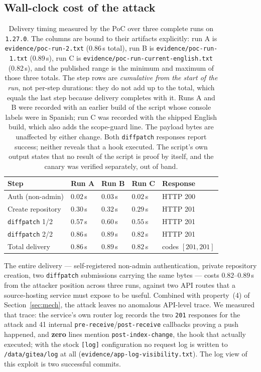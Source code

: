 \subsection{Wall-clock cost of the attack}
\label{sec:timing}

\begin{table}[t]
\centering
\footnotesize
\begin{tabular}{@{}p{2.0cm}p{1.0cm}p{1.0cm}p{1.0cm}p{1.7cm}@{}}
\toprule
Step & Run A & Run B & Run C & Response \\
\midrule
Auth (non-admin) & $0.02$\,s & $0.03$\,s & $0.02$\,s & HTTP 200 \\
Create repository & $0.30$\,s & $0.32$\,s & $0.29$\,s & HTTP 201 \\
\texttt{diffpatch} 1/2 & $0.57$\,s & $0.60$\,s & $0.55$\,s & HTTP 201 \\
\texttt{diffpatch} 2/2 & $0.86$\,s & $0.89$\,s & $0.82$\,s & HTTP 201 \\
\midrule
Total delivery & $\mathbf{0.86}$\,s & $\mathbf{0.89}$\,s & $\mathbf{0.82}$\,s & codes $[201,201]$ \\
\bottomrule
\end{tabular}
\caption{Delivery timing measured by the PoC over three complete runs on
\texttt{1.27.0}. The columns are bound to their artifacts explicitly: run A is
\texttt{evidence/poc-run-2.txt} (0.86\,s total), run B is
\texttt{evidence/poc-run-1.txt} (0.89\,s), run C is
\texttt{evidence/poc-run-current-english.txt} (0.82\,s), and the published range is
the minimum and maximum of those three totals. The step rows are \emph{cumulative from
the start of the run}, not per-step durations: they do not add up to the total, which equals
the last step because delivery completes with it. Runs A and B were recorded with an
earlier build of the script whose console
labels were in Spanish; run C was recorded with the shipped English build, which
also adds the scope-guard line. The payload bytes are unaffected by either
change. Both \texttt{diffpatch} responses report
success; neither reveals that a hook executed. The script's own output states
that no result of the script is proof by itself, and the canary was verified
separately, out of band.}
\label{tab:timing}
\end{table}

The entire delivery --- self-registered non-admin authentication, private
repository creation, two \texttt{diffpatch} submissions carrying the same bytes
--- costs $0.82$--$0.89$\,s from the attacker position across three runs, against
two API routes that a source-hosting service must expose to be useful. Combined
with property~(4) of Section~\ref{sec:mech}, the attack leaves no anomalous
API-level trace. We measured that trace: the service's own router log records
the two \texttt{201} responses for the attack and 41 internal
\texttt{pre-receive}/\texttt{post-receive} callbacks proving a push happened,
and \textbf{zero} lines mention \texttt{post-index-change}, the hook that
actually executed; with the stock \texttt{[log]} configuration no request log is
written to \texttt{/data/gitea/log} at all
(\texttt{evidence/app-log-visibility.txt}). The log view of this exploit is two
successful commits.

